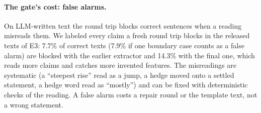 \documentclass[11pt]{article}
\begin{document}
\paragraph{The gate's cost: false alarms.} On LLM-written text the round trip blocks correct sentences when a reading
misreads them. We labeled every claim a fresh round trip blocks in the released texts of E3: 7.7\% of correct texts
(7.9\% if one boundary case counts as a false alarm) are blocked with the earlier extractor and 14.3\% with the final
one, which reads more claims and catches more
invented features. The misreadings are systematic (a ``steepest rise'' read as a jump, a hedge moved onto a settled
statement, a hedge word read as ``mostly'') and can be fixed with deterministic checks of the reading. A false alarm
costs a repair round or the template text, not a wrong statement.
\end{document}
